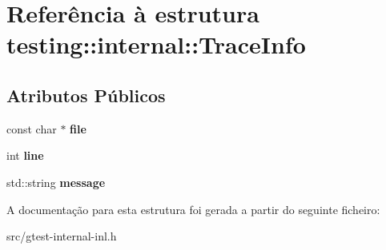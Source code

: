 \hypertarget{structtesting_1_1internal_1_1TraceInfo}{\section{Referência à estrutura testing\-:\-:internal\-:\-:Trace\-Info}
\label{structtesting_1_1internal_1_1TraceInfo}
}
\subsection*{Atributos Públicos}
\begin{DoxyCompactItemize}
\item 
\hypertarget{structtesting_1_1internal_1_1TraceInfo_a5d801209d3c0840aa55cfd4b67504254}{const char $\ast$ {\bfseries file}}\label{structtesting_1_1internal_1_1TraceInfo_a5d801209d3c0840aa55cfd4b67504254}

\item 
\hypertarget{structtesting_1_1internal_1_1TraceInfo_ae9d269de1b77f4a3180d0d34acb4d7ff}{int {\bfseries line}}\label{structtesting_1_1internal_1_1TraceInfo_ae9d269de1b77f4a3180d0d34acb4d7ff}

\item 
\hypertarget{structtesting_1_1internal_1_1TraceInfo_a39e74f39ce6d5fdbac799abdb1c27f90}{std\-::string {\bfseries message}}\label{structtesting_1_1internal_1_1TraceInfo_a39e74f39ce6d5fdbac799abdb1c27f90}

\end{DoxyCompactItemize}


A documentação para esta estrutura foi gerada a partir do seguinte ficheiro\-:\begin{DoxyCompactItemize}
\item 
src/gtest-\/internal-\/inl.\-h\end{DoxyCompactItemize}
